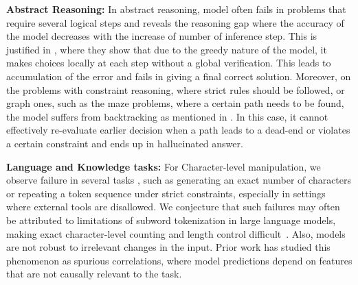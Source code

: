\documentclass{article}
\begin{document}
\textbf{Abstract Reasoning:}
In abstract reasoning, model often fails in problems that require several logical steps and reveals the reasoning gap where the accuracy of the model decreases with the increase of number of inference step. This is justified in \cite{saparov2022language} , where they show that due to the greedy nature of the model, it makes choices locally at each step without a global verification. This leads to accumulation of the error and fails in giving a final correct solution. Moreover, on the problems with constraint reasoning, where strict rules should be followed, or graph ones, such as the maze problems, where a certain path needs to be found, the model suffers from backtracking as mentioned in \cite{valmeekam2023planbench}. In this case, it cannot effectively re-evaluate earlier decision when a path leads to a dead-end or violates a certain constraint and ends up in hallucinated answer.

\textbf{Language and Knowledge tasks:}
For Character-level manipulation, we observe failure in several tasks , such as generating an exact number of characters or repeating a token sequence under strict constraints, especially in settings where external tools are disallowed. We conjecture that such failures may often be attributed to limitations of subword tokenization in large language models, making exact character-level counting and length control  difficult~\cite{zhang2024counting,fu2024large}. Also, models are not robust to irrelevant changes in the input. Prior work \cite{veitch2021counterfactual} has studied this phenomenon as spurious correlations, where model predictions depend on features that are not causally relevant to the task.
\end{document}

